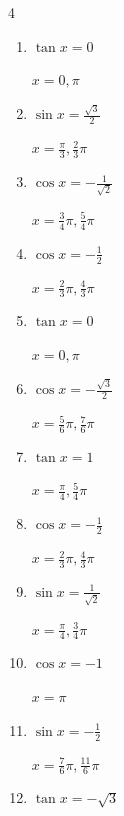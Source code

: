 \begin{multicols}{4}
\begin{enumerate}
  \item $\displaystyle \tan{x}  = 0$

        $\displaystyle x = 0 , \pi$

  \item $\displaystyle \sin{x}  = \frac{\sqrt{3}}{2}$

        $\displaystyle x = \frac{\pi}{3} , \frac{2}{3}\pi$

  \item $\displaystyle \cos{x}  = -\frac{1}{\sqrt{2}}$

        $\displaystyle x = \frac{3}{4}\pi , \frac{5}{4}\pi$

  \item $\displaystyle \cos{x}  = -\frac{1}{2}$

        $\displaystyle x = \frac{2}{3}\pi , \frac{4}{3}\pi$

  \item $\displaystyle \tan{x}  = 0$

        $\displaystyle x = 0 , \pi$

  \item $\displaystyle \cos{x}  = -\frac{\sqrt{3}}{2}$

        $\displaystyle x = \frac{5}{6}\pi , \frac{7}{6}\pi$

  \item $\displaystyle \tan{x}  = 1$

        $\displaystyle x = \frac{\pi}{4} , \frac{5}{4}\pi$

  \item $\displaystyle \cos{x}  = -\frac{1}{2}$

        $\displaystyle x = \frac{2}{3}\pi , \frac{4}{3}\pi$

\columnbreak %

  \item $\displaystyle \sin{x}  = \frac{1}{\sqrt{2}}$

        $\displaystyle x = \frac{\pi}{4} , \frac{3}{4}\pi$

  \item $\displaystyle \cos{x}  = -1$

        $\displaystyle x = \pi$

  \item $\displaystyle \sin{x}  = -\frac{1}{2}$

        $\displaystyle x = \frac{7}{6}\pi , \frac{11}{6}\pi$

  \item $\displaystyle \tan{x}  = -\sqrt{3}$


\end{enumerate}
\end{multicols}
